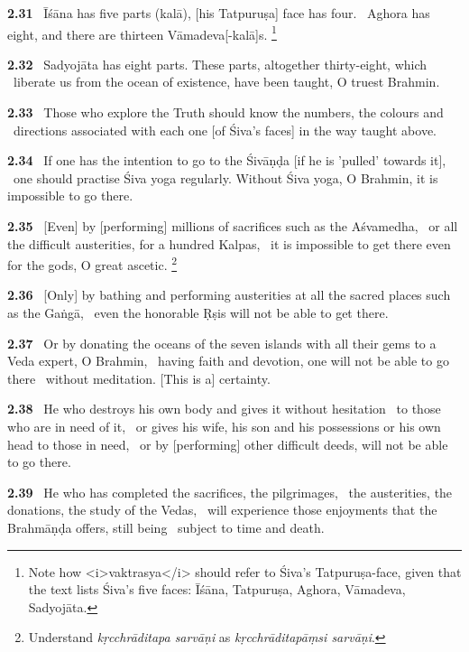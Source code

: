 \documentclass{article}
\newcommand{\skt}[1]{\textit{#1}}
\begin{document}
\textbf{2.31}%
\ Īśāna has five parts (kalā), [his Tatpuruṣa] face has four.%
\              Aghora has eight, and there are thirteen Vāmadeva[-kalā]s.%
\footnote{Note how <i>vaktrasya</i> should refer to Śiva's Tatpuruṣa-face,                 given that the text lists Śiva's five faces: Īśāna, Tatpuruṣa, Aghora, Vāmadeva, Sadyojāta. }%


\textbf{2.32}%
\ Sadyojāta has eight parts. These parts, altogether thirty-eight, which%
\              liberate us from the ocean of existence, have been taught, O truest Brahmin.%


\textbf{2.33}%
\ Those who explore the Truth should know the numbers, the colours and%
\              directions associated with each one [of Śiva's faces] in the way taught above.%


\textbf{2.34}%
\ If one has the intention to go to the Śivāṇḍa [if he is 'pulled' towards it],%
\              one should practise Śiva yoga regularly. Without Śiva yoga, O Brahmin, it is impossible to go there.%


\textbf{2.35}%
\ [Even] by [performing] millions of sacrifices such as the Aśvamedha,%
\              or all the difficult austerities, for a hundred Kalpas,%
\               it is impossible to get there even for the gods, O great ascetic.%
\footnote{Understand \skt{kṛcchrāditapa sarvāṇi} as \skt{kṛcchrāditapāṃsi sarvāṇi}. }%


\textbf{2.36}%
\ [Only] by bathing and performing austerities at all the sacred places such as the Gaṅgā,%
\               even the honorable Ṛṣis will not be able to get there.%


\textbf{2.37}%
\ Or by donating the oceans of the seven islands with all their gems to a Veda expert, O Brahmin,%
\              having faith and devotion, one will not be able to go there%
\              without meditation. [This is a] certainty.%


\textbf{2.38}%
\ He who destroys his own body and gives it without hesitation%
\               to those who are in need of it,%
\              or gives his wife, his son and his possessions or his own head to those in need,%
\                 or by [performing] other difficult deeds, will not be able to go there.%


\textbf{2.39}%
\ He who has completed the sacrifices, the pilgrimages,%
\              the austerities, the donations, the study of the Vedas,%
\              will experience those enjoyments that the Brahmāṇḍa offers, still being%
\              subject to time and death.%
\end{document}
